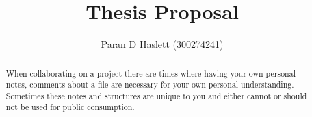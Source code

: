 \documentclass[12pt]{CRPITStyle}
\begin{document}
\title{Thesis Proposal}
\author{Paran D Haslett (300274241)}
\maketitle

\begin{abstract}
When collaborating on a project there are times where having your own personal notes, comments about a file are necessary for your own personal understanding.  Sometimes these notes and structures are unique to you and either cannot or should not be used for public consumption. 
\end{abstract}
\vspace{.1in}


\end{document}

